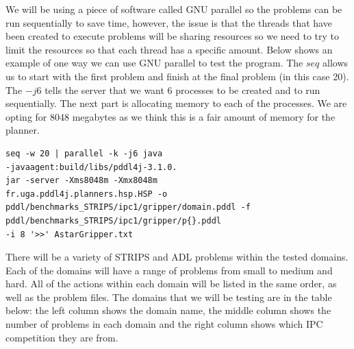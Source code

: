 We will be using a piece of software called GNU parallel\cite{GNU} so the problems can be run sequentially to save time, however, the issue is that the threads that have been created to execute problems will be sharing resources so we need to try to limit the resources so that each thread has a specific amount. Below shows an example of one way we can use GNU parallel to test the program. The $seq$ allows us to start with the first problem and finish at the final problem (in this case 20). The $-j 6$ tells the server that we want 6 processes to be created and to run sequentially. The next part is allocating memory to each of the processes. We are opting for 8048 megabytes as we think this is a fair amount of memory for the planner. 
\begin{verbatim}
seq -w 20 | parallel -k -j6 java 
-javaagent:build/libs/pddl4j-3.1.0.
jar -server -Xms8048m -Xmx8048m 
fr.uga.pddl4j.planners.hsp.HSP -o 
pddl/benchmarks_STRIPS/ipc1/gripper/domain.pddl -f
pddl/benchmarks_STRIPS/ipc1/gripper/p{}.pddl 
-i 8 '>>' AstarGripper.txt
\end{verbatim}
There will be a variety of STRIPS and ADL problems within the tested domains. Each of the domains will have a range of problems from small to medium and hard. All of the actions within each domain will be listed in the same order, as well as the problem files. The domains that we will be testing are in the table below: the left column shows the domain name, the middle column shows the number of problems in each domain and the right column shows which IPC competition they are from. 
